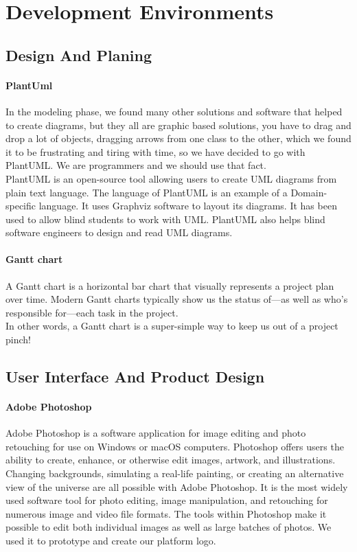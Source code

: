 \section{Development Environments}
\subsection{Design And Planing}

\paragraph*{PlantUml}
In the modeling phase, we found many other solutions and software that helped to create diagrams, but they all are graphic based solutions, you have to drag and drop a lot of objects, dragging arrows from one class to the other, which we found it to be frustrating and tiring with time, so we have decided to go with PlantUML. We are programmers and we should use that fact.\\
PlantUML is an open-source tool allowing users to create UML diagrams from plain text language. The language of PlantUML is an example of a Domain-specific language. It uses Graphviz software to layout its diagrams. It has been used to allow blind students to work with UML. PlantUML also helps blind software engineers to design and read UML diagrams.


\paragraph*{Gantt chart}
A Gantt chart is a horizontal bar chart that visually represents a project plan over time. Modern Gantt charts typically show us the status of—as well as who’s responsible for—each task in the project.\\

In other words, a Gantt chart is a super-simple way to keep us out of a project pinch!


\subsection{User Interface And Product Design}
\paragraph*{Adobe Photoshop}
Adobe Photoshop is a software application for image editing and photo retouching for use on Windows or macOS computers. Photoshop offers users the ability to create, enhance, or otherwise edit images, artwork, and illustrations. Changing backgrounds, simulating a real-life painting, or creating an alternative view of the universe are all possible with Adobe Photoshop. It is the most widely used software tool for photo editing, image manipulation, and retouching for numerous image and video file formats. The tools within Photoshop make it possible to edit both individual images as well as large batches of photos.
We used it to prototype and create our platform logo.
